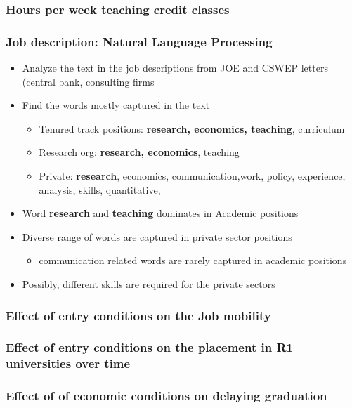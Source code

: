 \documentclass[11pt]{beamer}
\begin{document}
\begin{frame}[label = teaching]
	\frametitle{Hours per week teaching credit classes}
	
	\hyperlink{Occupation}{}
\end{frame}


\begin{frame}[label = NLP]
	\frametitle{Job description: Natural Language Processing}
	\begin{itemize}
		\item Analyze the text in the job descriptions from JOE and CSWEP letters (central bank, consulting firms
		\item Find the words mostly captured in the text
		\begin{itemize}
			\item Tenured track positions: \textbf{research, economics, teaching}, curriculum
			\item Research org: \textbf{research, economics}, teaching
			\item Private: \textbf{research}, economics, communication,work, policy, experience, analysis, skills, quantitative, 
		\end{itemize}
		
		\item Word \textbf{research} and \textbf{teaching} dominates in Academic positions
		\item Diverse range of words are captured in private sector positions
		\begin{itemize}
			\item communication related words are rarely captured in academic positions
		\end{itemize} 
		\item Possibly, different skills are required for the private sectors \hyperlink{Occupation}{}
	\end{itemize}
\end{frame}


{
	\begin{frame}[label = mobility]
		\frametitle{Effect of entry conditions on the Job mobility}
		
		\hyperlink{discussion}{}
	\end{frame}
}

{
	\begin{frame}[label = signal]
		\frametitle{Effect of entry conditions on the placement in R1 universities over time}
		
		\hyperlink{discussion}{}
	\end{frame}
}

{
	\begin{frame}[label = delay]
		\frametitle{Effect of of economic conditions on delaying graduation}
		 
		\hyperlink{robustness}{}
	\end{frame}
}
\end{document}
